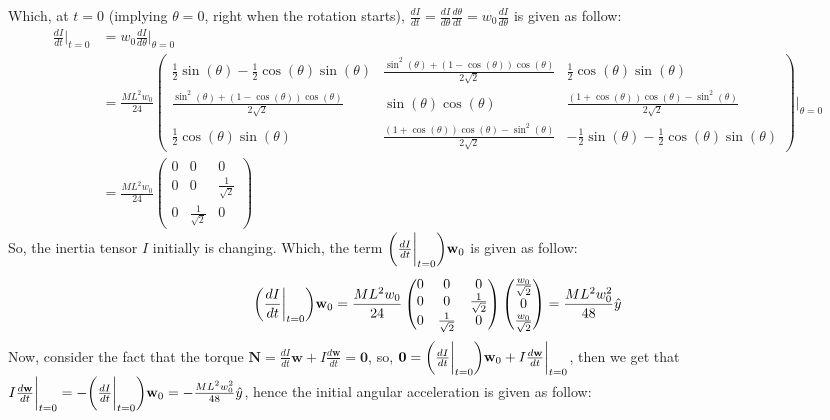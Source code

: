 \documentclass{article}
\DeclarePairedDelimiter{\paran}{(}{)}%
\newcommand{\bN}{\textbf{N}} %
\newcommand{\bw}{\textbf{w}} %
\newcommand{\bzero}{\textbf{0}}
\begin{document}
Which, at $t=0$ (implying $\theta=0$, right when the rotation starts), $\frac{dI}{dt} = \frac{dI}{d\theta}\frac{d\theta}{dt} = w_0\frac{dI}{d\theta}$ is given as follow:
\begin{align}
    \frac{dI}{dt}\bigg|_{t=0} &= w_0\frac{dI}{d\theta}\bigg|_{\theta=0}\\
    &= \frac{ML^2w_0}{24}\begin{pmatrix}
        \frac{1}{2}\sin(\theta) - \frac{1}{2}\cos(\theta)\sin(\theta) & \frac{\sin^2(\theta)+(1-\cos(\theta))\cos(\theta)}{2\sqrt{2}} & \frac{1}{2}\cos(\theta)\sin(\theta)\\
        \frac{\sin^2(\theta)+(1-\cos(\theta))\cos(\theta)}{2\sqrt{2}} & \sin(\theta)\cos(\theta) & \frac{(1+\cos(\theta))\cos(\theta)-\sin^2(\theta)}{2\sqrt{2}}\\
        \frac{1}{2}\cos(\theta)\sin(\theta) & \frac{(1+\cos(\theta))\cos(\theta)-\sin^2(\theta)}{2\sqrt{2}} & -\frac{1}{2}\sin(\theta)-\frac{1}{2}\cos(\theta)\sin(\theta)
    \end{pmatrix}\bigg|_{\theta=0}\\
    &= \frac{ML^2w_0}{24}\begin{pmatrix}
        0 & 0 & 0\\
        0 & 0 & \frac{1}{\sqrt{2}}\\
        0 & \frac{1}{\sqrt{2}} & 0
    \end{pmatrix}
\end{align}
So, the inertia tensor $I$ initially is changing. Which, the term $\paran*{\frac{dI}{dt}\bigg|_{t=0}}\bw_0$ is given as follow:
\begin{align}
    \paran*{\frac{dI}{dt}\bigg|_{t=0}}\bw_0 = \frac{ML^2w_0}{24}\begin{pmatrix}
        0&0&0\\0&0&\frac{1}{\sqrt{2}}\\0&\frac{1}{\sqrt{2}}&0
    \end{pmatrix}\begin{pmatrix}
        \frac{w_0}{\sqrt{2}}\\0\\\frac{w_0}{\sqrt{2}}
    \end{pmatrix} = \frac{ML^2w_0^2}{48}\hat{y}
\end{align}
Now, consider the fact that the torque $\bN = \frac{dI}{dt}\bw+I\frac{d\bw}{dt} = \bzero$, so, $\bzero=\paran*{\frac{dI}{dt}\bigg|_{t=0}}\bw_0 + I\frac{d\bw}{dt}\bigg|_{t=0}$, then we get that $I\frac{d\bw}{dt}\bigg|_{t=0} = -\paran*{\frac{dI}{dt}\bigg|_{t=0}}\bw_0 = -\frac{ML^2w_0^2}{48}\hat{y}$, hence the initial angular acceleration is given as follow:
\end{document}
